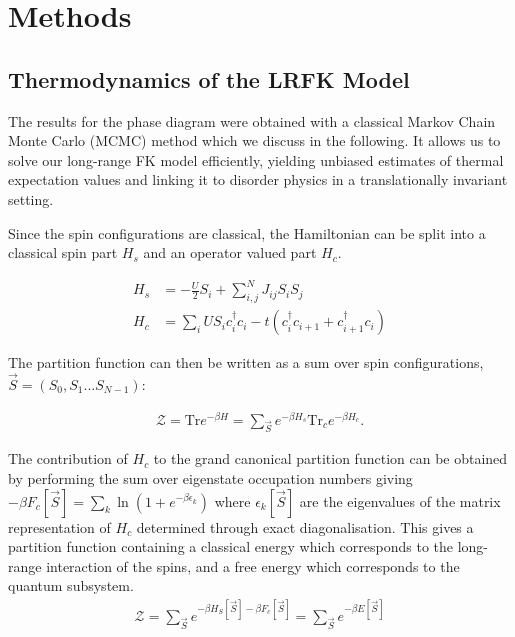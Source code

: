 \hypertarget{fk-methods}{%
\section{Methods}\label{fk-methods}}

\hypertarget{thermodynamics-of-the-lrfk-model}{%
\subsection{Thermodynamics of the LRFK Model}\label{thermodynamics-of-the-lrfk-model}}

The results for the phase diagram were obtained with a classical Markov Chain Monte Carlo (MCMC) method which we discuss in the following. It allows us to solve our long-range FK model efficiently, yielding unbiased estimates of thermal expectation values and linking it to disorder physics in a translationally invariant setting.

Since the spin configurations are classical, the Hamiltonian can be split into a classical spin part \(H_s\) and an operator valued part \(H_c\).

\[\begin{aligned}
H_s& = - \frac{U}{2}S_i + \sum_{i, j}^{N} J_{ij} S_i S_j \\
H_c& = \sum_i U S_i c^\dagger_{i}c_{i} -t(c^\dagger_{i}c_{i+1} + c^\dagger_{i+1}c_{i}) \end{aligned}\]

The partition function can then be written as a sum over spin configurations, \(\vec{S} = (S_0, S_1...S_{N-1})\):

\[\begin{aligned}
\mathcal{Z} = \mathrm{Tr} e^{-\beta H}= \sum_{\vec{S}} e^{-\beta H_s} \mathrm{Tr}_c e^{-\beta H_c} .\end{aligned}\]

The contribution of \(H_c\) to the grand canonical partition function can be obtained by performing the sum over eigenstate occupation numbers giving \(-\beta F_c[\vec{S}] = \sum_k \ln{(1 + e^{- \beta \epsilon_k})}\) where \({\epsilon_k[\vec{S}]}\) are the eigenvalues of the matrix representation of \(H_c\) determined through exact diagonalisation. This gives a partition function containing a classical energy which corresponds to the long-range interaction of the spins, and a free energy which corresponds to the quantum subsystem. \[\begin{aligned}
\mathcal{Z} = \sum_{\vec{S}} e^{-\beta H_S[\vec{S}] - \beta F_c[\vec{S}]} = \sum_{\vec{S}} e^{-\beta E[\vec{S}]}\end{aligned}\]

